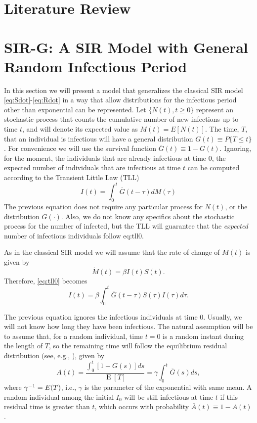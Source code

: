 \documentclass[twoside,USenglish,10pt]{article}
\newcommand{\Ab}{\overline{A}\xspace}
\newcommand{\Gb}{\overline{G}\xspace}
\newcommand{\gami}{\ensuremath\gamma^{-1}\xspace}
\DeclareMathOperator{\Exp}{E}       %
\begin{document}
\section{Literature Review}\label{sc:litrev}



\section{SIR-G: A SIR Model with General Random Infectious Period}\label{sc:model}

In this section we will present a model that generalizes the classical SIR model \eqref{eq:Sdot}-\eqref{eq:Rdot} in a way that allow distributions for the infectious period other than exponential can be represented.
Let $\{N(t),t\geq 0\}$ represent an stochastic process that counts the cumulative number of new infections up to time $t$, and will denote its expected value as $M(t)=E[N(t)]$. 
The time, $T$, that an individual is infectious will have a general distribution $G(t)\equiv P\{T\leq t\}$.
For convenience we will use the survival function $\Gb(t) \equiv 1-G(t)$. Ignoring, for the moment, the individuals that are already infectious at time $0$, the expected number of individuals that are infectious at time $t$ can be computed according to the Transient Little Law (TLL) \cite{fral.ea:tll} 
\begin{equation}
	I(t) = \int_0^t \Gb(t-\tau) dM(\tau)   \label{eq:tll0}
\end{equation} 
The previous equation does not require any particular process for $N(t)$, or the distribution $G(\cdot)$. Also, we do not know any specifics about the stochastic process for the number of infected, but the TLL will guarantee that the  \textit{expected} number of infectious individuals follow {eq:tll0}.

As in the classical SIR model we will assume that the rate of change of $M(t)$ is given by
\begin{equation}
\dot{M}(t) = \beta I(t)S(t).
\label{eq:dM}
\end{equation}
Therefore, \eqref{eq:tll0} becomes
\begin{equation}
	I(t) = \beta\int_0^t \Gb(t-\tau) S(\tau)I(\tau)d\tau.   \label{eq:tll}
\end{equation}

The previous equation ignores the infectious individuals at time 0. Usually, we will not know how long they have been infectious. The natural assumption will be to assume that, for a random individual, time $t=0$ is a random instant during the length of $T$, so the remaining time will follow the equilibrium residual distribution (see, e.g., \cite{kulk95}), given by
\begin{equation}
	A(t) =  \frac{\int_0^t[1-G(s)]ds}{\Exp{[T]}} = \gamma \int_0^t \Gb(s)ds,
\label{eq:eqdist}
\end{equation}
where $\gami=E(T)$, i.e., $\gamma$ is the parameter of the exponential with same mean. A random individual among the initial $I_0$ will be still infectious at time $t$ if this residual time is greater than $t$, which occurs with probability $\Ab(t)\equiv 1- A(t)$. 
\end{document}
